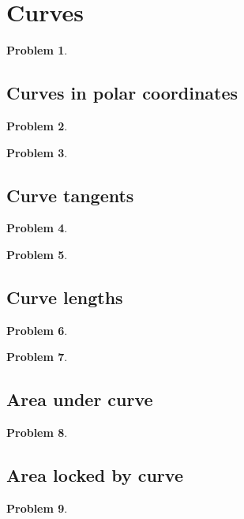 \documentclass{article}
\newtheorem{problem}{Problem}
\begin{document}
\section{Curves}
\begin{problem}

\end{problem}
\subsection{Curves in polar coordinates}
\begin{problem}

\end{problem}
\begin{problem}

\end{problem}

\subsection{Curve tangents}
\begin{problem}

\end{problem}
\begin{problem}

\end{problem}
\subsection{Curve lengths}
\begin{problem}

\end{problem}


\begin{problem}

\end{problem}
\subsection{Area under curve}
\begin{problem}

\end{problem}
\subsection{Area locked by  curve}
\begin{problem}

\end{problem}

\end{document}
